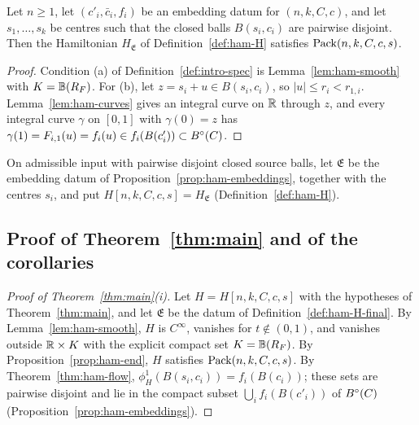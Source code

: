 \begin{proposition}\label{prop:ham-end}
Let $n\ge1$, let $(c'_i,\bar c_i,f_i)$ be an embedding datum for $(n,k,C,c)$, and let $s_1,\dots,s_k$ be centres such
that the closed balls $B(s_i,c_i)$ are pairwise disjoint. Then the Hamiltonian $H_{\mathfrak E}$ of
Definition~\ref{def:ham-H} satisfies $\mathrm{Pack}(n,k,C,c,s)$.
\end{proposition}

\begin{proof}
Condition (a) of Definition~\ref{def:intro-spec} is Lemma~\ref{lem:ham-smooth} with $K=\mathbb{B}(R_F)$. For (b), let
$z=s_i+u\in B(s_i,c_i)$, so $|u|\le r_i<r_{1,i}$. Lemma~\ref{lem:ham-curves} gives an integral curve on $\mathbb{R}$ through $z$,
and every integral curve $\gamma$ on $[0,1]$ with $\gamma(0)=z$ has $\gamma(1)=F_{i,1}(u)=f_i(u)\in f_i(B(c'_i))\subset B^{\circ}(C)$.
\end{proof}

\begin{definition}\label{def:ham-H-final}
On admissible input with pairwise disjoint closed source balls, let $\mathfrak E$ be the embedding datum of
Proposition~\ref{prop:ham-embeddings}, together with the centres $s_i$, and put
$H[n,k,C,c,s]=H_{\mathfrak E}$ (Definition~\ref{def:ham-H}).
\end{definition}
\subsection{Proof of Theorem~\texorpdfstring{\ref{thm:main}}{C} and of the corollaries}\label{sec:ham-proof-main}

\begin{proof}[Proof of Theorem~\ref{thm:main}\textup{(i)}]
Let $H=H[n,k,C,c,s]$ with the hypotheses of Theorem~\ref{thm:main}, and let $\mathfrak E$ be the datum of
Definition~\ref{def:ham-H-final}. By Lemma~\ref{lem:ham-smooth}, $H$ is $C^\infty$, vanishes for $t\notin(0,1)$, and vanishes
outside $\mathbb{R}\times K$ with the explicit compact set $K=\mathbb{B}(R_F)$. By Proposition~\ref{prop:ham-end}, $H$ satisfies
$\mathrm{Pack}(n,k,C,c,s)$. By Theorem~\ref{thm:ham-flow}, $\phi^1_H(B(s_i,c_i))=f_i(B(c_i))$; these sets are pairwise disjoint and lie
in the compact subset $\bigcup_if_i(B(c'_i))$ of $B^{\circ}(C)$ (Proposition~\ref{prop:ham-embeddings}).
\end{proof}

